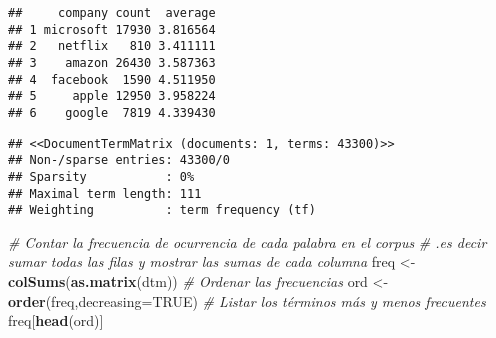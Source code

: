 \documentclass[]{article}
\newenvironment{Shaded}{\begin{snugshade}}{\end{snugshade}}
\newcommand{\KeywordTok}[1]{\textcolor[rgb]{0.13,0.29,0.53}{\textbf{#1}}}
\newcommand{\DataTypeTok}[1]{\textcolor[rgb]{0.13,0.29,0.53}{#1}}
\newcommand{\DecValTok}[1]{\textcolor[rgb]{0.00,0.00,0.81}{#1}}
\newcommand{\StringTok}[1]{\textcolor[rgb]{0.31,0.60,0.02}{#1}}
\newcommand{\CommentTok}[1]{\textcolor[rgb]{0.56,0.35,0.01}{\textit{#1}}}
\newcommand{\OtherTok}[1]{\textcolor[rgb]{0.56,0.35,0.01}{#1}}
\newcommand{\ControlFlowTok}[1]{\textcolor[rgb]{0.13,0.29,0.53}{\textbf{#1}}}
\newcommand{\OperatorTok}[1]{\textcolor[rgb]{0.81,0.36,0.00}{\textbf{#1}}}
\newcommand{\NormalTok}[1]{#1}
\begin{document}
\begin{verbatim}
##     company count  average
## 1 microsoft 17930 3.816564
## 2   netflix   810 3.411111
## 3    amazon 26430 3.587363
## 4  facebook  1590 4.511950
## 5     apple 12950 3.958224
## 6    google  7819 4.339430
\end{verbatim}

\begin{Shaded}
\end{Shaded}

\begin{verbatim}
## <<DocumentTermMatrix (documents: 1, terms: 43300)>>
## Non-/sparse entries: 43300/0
## Sparsity           : 0%
## Maximal term length: 111
## Weighting          : term frequency (tf)
\end{verbatim}

\begin{Shaded}
\begin{Highlighting}[]
\CommentTok{# Contar la frecuencia de ocurrencia de cada palabra en el corpus}
\CommentTok{# .es decir sumar todas las filas y mostrar las sumas de cada columna}
\NormalTok{freq <-}\StringTok{ }\KeywordTok{colSums}\NormalTok{(}\KeywordTok{as.matrix}\NormalTok{(dtm))}
\CommentTok{# Ordenar las frecuencias}
\NormalTok{ord <-}\StringTok{ }\KeywordTok{order}\NormalTok{(freq,}\DataTypeTok{decreasing=}\OtherTok{TRUE}\NormalTok{)}
\CommentTok{# Listar los términos más y menos frecuentes}
\NormalTok{freq[}\KeywordTok{head}\NormalTok{(ord)]}
\end{Highlighting}
\end{Shaded}
\end{document}
